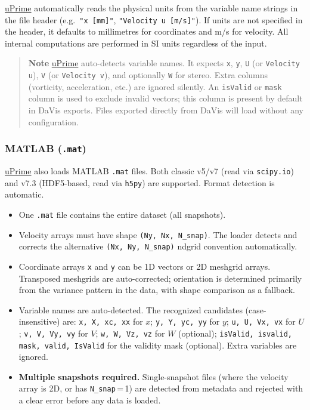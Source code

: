\href{https://cmdrryder.github.io/uPrime/}{uPrime} automatically reads the physical units from the variable name strings in the file header (e.g.\ \texttt{"x [mm]"}, \texttt{"Velocity u [m/s]"}). If units are not specified in the header, it defaults to millimetres for coordinates and m/s for velocity. All internal computations are performed in SI units regardless of the input.

\begin{quote}
\textbf{Note}
\href{https://cmdrryder.github.io/uPrime/}{uPrime} auto-detects variable names. It expects \texttt{x}, \texttt{y}, \texttt{U} (or \texttt{Velocity u}), \texttt{V} (or \texttt{Velocity v}), and optionally \texttt{W} for stereo. Extra columns (vorticity, acceleration, etc.) are ignored silently. An \texttt{isValid} or \texttt{mask} column is used to exclude invalid vectors; this column is present by default in DaVis exports. Files exported directly from DaVis will load without any configuration.
\end{quote}

\subsubsection{MATLAB (\texttt{.mat})}
\label{sec:matformat}

\href{https://cmdrryder.github.io/uPrime/}{uPrime} also loads MATLAB \texttt{.mat} files. Both classic v5/v7 (read via \texttt{scipy.io}) and v7.3 (HDF5-based, read via \texttt{h5py}) are supported. Format detection is automatic.

\begin{itemize}[leftmargin=1.5em]
  \item One \texttt{.mat} file contains the entire dataset (all snapshots).
  \item Velocity arrays must have shape \texttt{(Ny, Nx, N\_snap)}. The loader detects and corrects the alternative \texttt{(Nx, Ny, N\_snap)} ndgrid convention automatically.
  \item Coordinate arrays \texttt{x} and \texttt{y} can be 1D vectors or 2D meshgrid arrays. Transposed meshgrids are auto-corrected; orientation is determined primarily from the variance pattern in the data, with shape comparison as a fallback.
  \item Variable names are auto-detected. The recognized candidates (case-insensitive) are: \texttt{x, X, xc, xx} for $x$; \texttt{y, Y, yc, yy} for $y$; \texttt{u, U, Vx, vx} for $U$; \texttt{v, V, Vy, vy} for $V$; \texttt{w, W, Vz, vz} for $W$ (optional); \texttt{isValid, isvalid, mask, valid, IsValid} for the validity mask (optional). Extra variables are ignored.
  \item \textbf{Multiple snapshots required.} Single-snapshot files (where the velocity array is 2D, or has \texttt{N\_snap}\,=\,1) are detected from metadata and rejected with a clear error before any data is loaded.
\end{itemize}

